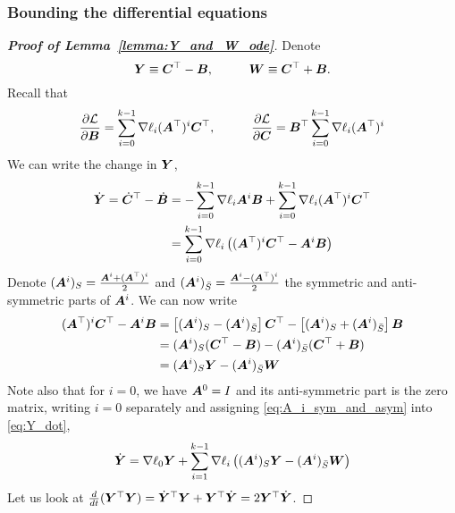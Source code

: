 \subsubsection{Bounding the differential equations}

\begin{proof}[\textbf{Proof of Lemma~\ref{lemma:Y_and_W_ode}}]
Denote
\begin{equation}
    {\bm{Y}}\equiv {\bm{C}}^\top -{\bm{B}}, \hspace{1cm} {\bm{W}}\equiv {\bm{C}}^\top + {\bm{B}}.
\end{equation}
Recall that
\begin{equation}
    \frac{\partial\mathcal{L}}{\partial {\bm{B}}} = \sum_{i=0}^{k-1}\nabla\ell_i ({\bm{A}}^\top)^i {\bm{C}}^\top, \hspace{1cm} \frac{\partial\mathcal{L}}{\partial {\bm{C}}} = {\bm{B}}^\top\sum_{i=0}^{k-1}\nabla\ell_i ({\bm{A}}^\top)^i
\end{equation}
We can write the change in ${\bm{Y}}$,
\begin{align}\label{eq:Y_dot}
    \dot{{\bm{Y}}} =\dot{{\bm{C}}}^\top - \dot{{\bm{B}}} & = -\sum_{i=0}^{k-1}\nabla\ell_i {\bm{A}}^i{\bm{B}} + \sum_{i=0}^{k-1}\nabla\ell_i ({\bm{A}}^\top)^i {\bm{C}}^\top\\
    & = \sum_{i=0}^{k-1}\nabla\ell_i\left(({\bm{A}}^\top)^i{\bm{C}}^\top - {\bm{A}}^i{\bm{B}}\right)\nonumber
\end{align}
Denote $({\bm{A}}^i)_S=\frac{{\bm{A}}^i+({\bm{A}}^\top)^i}{2}$ and $({\bm{A}}^i)_{\bar{S}}=\frac{{\bm{A}}^i-({\bm{A}}^\top)^i}{2}$ the symmetric and anti-symmetric parts of ${\bm{A}}^i$. We can now write
\begin{align}\label{eq:A_i_sym_and_asym}
    ({\bm{A}}^\top)^i{\bm{C}}^\top - {\bm{A}}^i{\bm{B}} & =\left[({\bm{A}}^i)_S - ({\bm{A}}^i)_{\bar{S}}\right]{\bm{C}}^\top - \left[({\bm{A}}^i)_S + ({\bm{A}}^i)_{\bar{S}}\right]{\bm{B}}\\
    & = ({\bm{A}}^i)_S({\bm{C}}^\top - {\bm{B}}) - ({\bm{A}}^i)_{\bar{S}}({\bm{C}}^\top + {\bm{B}})\nonumber\\
    & = ({\bm{A}}^i)_S {\bm{Y}} - ({\bm{A}}^i)_{\bar{S}}{\bm{W}}\nonumber
\end{align}
Note also that for $i=0$, we have ${\bm{A}}^0=I$ and its anti-symmetric part is the zero matrix, writing $i=0$ separately and assigning \eqref{eq:A_i_sym_and_asym} into \eqref{eq:Y_dot},
\begin{equation}\label{eq:Y_dot_v2}
    \dot{{\bm{Y}}} = \nabla\ell_0 {\bm{Y}} + \sum_{i=1}^{k-1}\nabla\ell_i\left(({\bm{A}}^i)_S {\bm{Y}} - ({\bm{A}}^i)_{\bar{S}}{\bm{W}}\right)
\end{equation}
Let us look at $\frac{d}{dt}({\bm{Y}}^\top {\bm{Y}})=\dot{{\bm{Y}}}^\top {\bm{Y}} + {\bm{Y}}^\top \dot{{\bm{Y}}}=2{\bm{Y}}^\top\dot{{\bm{Y}}}$.


\end{proof}
